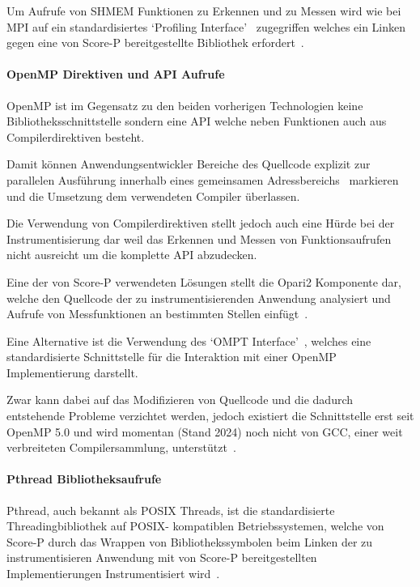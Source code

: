 \documentclass[german,proseminar,hyperref,utf8]{zihpub}
\begin{document}
    Um Aufrufe von SHMEM Funktionen zu Erkennen und zu Messen wird wie bei MPI auf ein standardisiertes
    `Profiling Interface'~ zugegriffen welches ein Linken gegen eine von
    Score-P bereitgestellte Bibliothek erfordert~.

    \paragraph{OpenMP Direktiven und API Aufrufe}
    OpenMP ist im Gegensatz zu den beiden vorherigen Technologien keine Bibliotheksschnittstelle
    sondern eine API welche neben Funktionen auch aus Compilerdirektiven besteht.

    Damit können Anwendungsentwickler Bereiche des Quellcode explizit zur parallelen Ausführung
    innerhalb eines gemeinsamen Adressbereichs~ markieren und die Umsetzung 
    dem verwendeten Compiler überlassen.

    Die Verwendung von Compilerdirektiven stellt jedoch auch eine Hürde bei der Instrumentisierung dar
    weil das Erkennen und Messen von Funktionsaufrufen nicht ausreicht um die komplette API abzudecken.

    Eine der von Score-P verwendeten Lösungen stellt die Opari2 Komponente dar, welche den Quellcode der
    zu instrumentisierenden Anwendung analysiert und Aufrufe von Messfunktionen an bestimmten Stellen
    einfügt~.

    Eine Alternative ist die Verwendung des `OMPT Interface'~, welches eine
    standardisierte Schnittstelle für die Interaktion mit einer OpenMP Implementierung darstellt.

    Zwar kann dabei auf das Modifizieren von Quellcode und die dadurch entstehende Probleme verzichtet werden,
    jedoch existiert die Schnittstelle erst seit OpenMP 5.0 und wird momentan (Stand 2024) noch nicht von
    GCC, einer weit verbreiteten Compilersammlung, unterstützt~\cite{gomp}. 

    \paragraph{Pthread Bibliotheksaufrufe}
    Pthread, auch bekannt als POSIX Threads, ist die standardisierte Threadingbibliothek auf POSIX-
    kompatiblen Betriebssystemen, welche von Score-P durch das Wrappen von Bibliothekssymbolen
    beim Linken der zu instrumentisieren Anwendung mit von Score-P bereitgestellten
    Implementierungen Instrumentisiert wird~.
\end{document}
